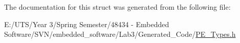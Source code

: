 The documentation for this struct was generated from the following file\+:\begin{DoxyCompactItemize}
\item 
E\+:/\+U\+T\+S/\+Year 3/\+Spring Semester/48434 -\/ Embedded Software/\+S\+V\+N/embedded\+\_\+software/\+Lab3/\+Generated\+\_\+\+Code/\hyperlink{_p_e___types_8h}{P\+E\+\_\+\+Types.\+h}\end{DoxyCompactItemize}
